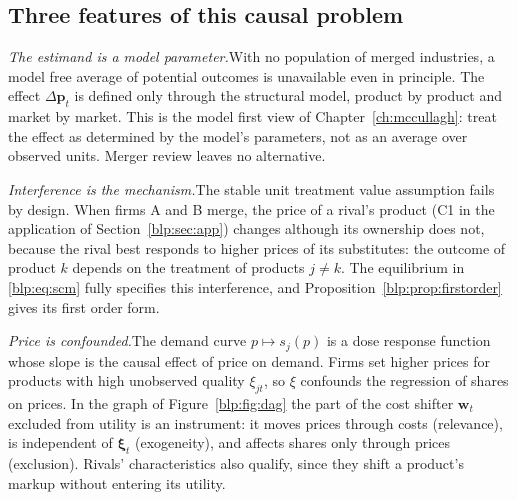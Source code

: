 \subsection{Three features of this causal problem}

\medskip\noindent\textit{The estimand is a model parameter.}\enspace With no population of merged industries, a model free average of potential outcomes is unavailable even in principle. The effect $\Delta\bm p_t$ is defined only through the
structural model, product by product and market by market. This is the model first view of Chapter~\ref{ch:mccullagh}: treat the effect as determined by the model's parameters, not as an average over observed units. Merger review leaves no alternative.

\medskip\noindent\textit{Interference is the mechanism.}\enspace The stable unit treatment value
assumption fails by design. When firms A and B merge, the price of a rival's product (C1 in the application of Section~\ref{blp:sec:app}) changes although its ownership does not, because the rival best responds to higher prices of its substitutes: the outcome of product $k$ depends on the treatment of products $j\neq k$. The equilibrium in \eqref{blp:eq:scm} fully specifies this interference, and Proposition~\ref{blp:prop:firstorder} gives its first order form.

\medskip\noindent\textit{Price is confounded.}\enspace The demand curve $p\mapsto s_j(p)$ is a dose response function whose slope is the causal effect of price on demand. Firms set higher prices for products with high unobserved quality $\xi_{jt}$, so
$\xi$ confounds the regression of shares on prices. In the graph of Figure~\ref{blp:fig:dag} the part of the cost shifter $\bm w_t$ excluded from utility is an instrument: it moves prices through costs (relevance), is independent of $\bm\xi_t$ (exogeneity), and affects shares only through prices (exclusion). Rivals' characteristics also qualify, since they shift a product's markup without entering its utility. 

